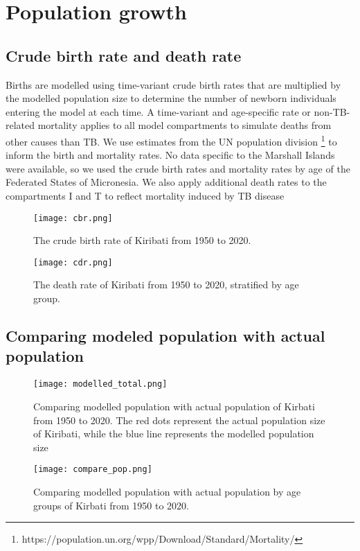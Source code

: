 

\section{Population growth}
\subsection{Crude birth rate and death rate}
Births are modelled using time-variant crude birth rates that are multiplied by the modelled population 
size to determine the number of newborn individuals entering the model at each time. A time-variant 
and age-specific rate or non-TB-related mortality applies to all model compartments to simulate 
deaths from other causes than TB. We use estimates from the UN population division \footnote{https://population.un.org/wpp/Download/Standard/Mortality/}  to inform the 
birth and mortality rates. No data specific to the Marshall Islands were available, so we used the crude 
birth rates and mortality rates by age of the Federated States of Micronesia.
We also apply additional death rates to the compartments I and T to reflect mortality induced by TB 
disease
\begin{figure}[!htb]
    \texttt{[image: cbr.png]}
    \caption{The crude birth rate of Kiribati from 1950 to 2020.}
    \label{fig:cbr}
\end{figure}

\begin{figure}[!htb]
    \texttt{[image: cdr.png]}
    \caption{The death rate of Kiribati from 1950 to 2020, stratified by age group.}
    \label{fig:cdr}
\end{figure}

\subsection{Comparing modeled population with actual population}
\begin{figure}[!htb]
    \texttt{[image: modelled\_total.png]}
    \caption{Comparing modelled population with actual population of Kirbati from 1950 to 2020. The red dots represent the actual population size of Kiribati,
     while the blue line represents the modelled population size}
    \label{fig:modelled_total}
\end{figure}

\begin{figure}[!htb]
    \texttt{[image: compare\_pop.png]}
    \caption{Comparing modelled population with actual population by age groups of Kirbati from 1950 to 2020.}
    \label{fig:compare_group}
\end{figure}